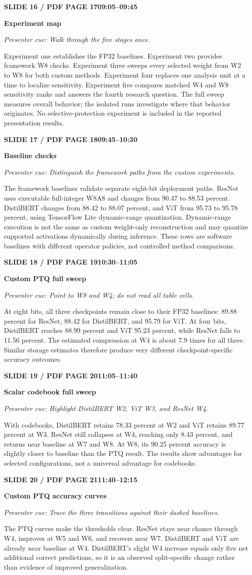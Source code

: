 \documentclass[11pt,a4paper]{article}
\newcommand{\slidetitle}[3]{%
  \vspace{2mm}\noindent
  \colorbox{TUblue}{\parbox{\dimexpr\textwidth-2\fboxsep}{\color{white}\bfseries #1\hfill #2}}%
  \par\textcolor{TUorange}{\bfseries #3}\par
}
\newcommand{\cue}[1]{\textit{\textcolor{TUblue}{Presenter cue: #1}}\par}
\newcommand{\spoken}[1]{#1\par}
\begin{document}
\slidetitle{SLIDE 16 / PDF PAGE 17}{09:05--09:45}{Experiment map}
\cue{Walk through the five stages once.}
\spoken{Experiment one establishes the FP32 baselines. Experiment two provides framework W8 checks. Experiment three sweeps every selected weight from W2 to W8 for both custom methods. Experiment four replaces one analysis unit at a time to localize sensitivity. Experiment five compares matched W4 and W8 sensitivity ranks and answers the fourth research question. The full sweep measures overall behavior; the isolated runs investigate where that behavior originates. No selective-protection experiment is included in the reported presentation results.}

\slidetitle{SLIDE 17 / PDF PAGE 18}{09:45--10:30}{Baseline checks}
\cue{Distinguish the framework paths from the custom experiments.}
\spoken{The framework baselines validate separate eight-bit deployment paths. ResNet uses executable full-integer W8A8 and changes from 90.47 to 88.53 percent. DistilBERT changes from 88.42 to 88.07 percent, and ViT from 95.73 to 95.78 percent, using TensorFlow Lite dynamic-range quantization. Dynamic-range execution is not the same as custom weight-only reconstruction and may quantize supported activations dynamically during inference. These rows are software baselines with different operator policies, not controlled method comparisons.}

\slidetitle{SLIDE 18 / PDF PAGE 19}{10:30--11:05}{Custom PTQ full sweep}
\cue{Point to W8 and W4; do not read all table cells.}
\spoken{At eight bits, all three checkpoints remain close to their FP32 baselines: 89.88 percent for ResNet, 88.42 for DistilBERT, and 95.79 for ViT. At four bits, DistilBERT reaches 88.99 percent and ViT 95.23 percent, while ResNet falls to 11.56 percent. The estimated compression at W4 is about 7.9 times for all three. Similar storage estimates therefore produce very different checkpoint-specific accuracy outcomes.}

\slidetitle{SLIDE 19 / PDF PAGE 20}{11:05--11:40}{Scalar codebook full sweep}
\cue{Highlight DistilBERT W2, ViT W3, and ResNet W4.}
\spoken{With codebooks, DistilBERT retains 78.33 percent at W2 and ViT retains 89.77 percent at W3. ResNet still collapses at W4, reaching only 8.43 percent, and returns near baseline at W7 and W8. At W8, its 90.25 percent accuracy is slightly closer to baseline than the PTQ result. The results show advantages for selected configurations, not a universal advantage for codebooks.}

\slidetitle{SLIDE 20 / PDF PAGE 21}{11:40--12:15}{Custom PTQ accuracy curves}
\cue{Trace the three transitions against their dashed baselines.}
\spoken{The PTQ curves make the thresholds clear. ResNet stays near chance through W4, improves at W5 and W6, and recovers near W7. DistilBERT and ViT are already near baseline at W4. DistilBERT's slight W4 increase equals only five net additional correct predictions, so it is an observed split-specific change rather than evidence of improved generalization.}
\end{document}
